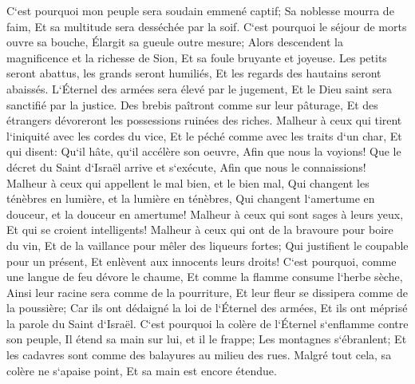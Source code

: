 \verse C`est pourquoi mon peuple sera soudain emmené captif; Sa noblesse mourra de faim, Et sa multitude sera desséchée par la soif. 
\verse C`est pourquoi le séjour de morts ouvre sa bouche, Élargit sa gueule outre mesure; Alors descendent la magnificence et la richesse de Sion, Et sa foule bruyante et joyeuse. 
\verse Les petits seront abattus, les grands seront humiliés, Et les regards des hautains seront abaissés. 
\verse L`Éternel des armées sera élevé par le jugement, Et le Dieu saint sera sanctifié par la justice. 
\verse Des brebis paîtront comme sur leur pâturage, Et des étrangers dévoreront les possessions ruinées des riches. 
\verse Malheur à ceux qui tirent l`iniquité avec les cordes du vice, Et le péché comme avec les traits d`un char, 
\verse Et qui disent: Qu`il hâte, qu`il accélère son oeuvre, Afin que nous la voyions! Que le décret du Saint d`Israël arrive et s`exécute, Afin que nous le connaissions! 
\verse Malheur à ceux qui appellent le mal bien, et le bien mal, Qui changent les ténèbres en lumière, et la lumière en ténèbres, Qui changent l`amertume en douceur, et la douceur en amertume! 
\verse Malheur à ceux qui sont sages à leurs yeux, Et qui se croient intelligents! 
\verse Malheur à ceux qui ont de la bravoure pour boire du vin, Et de la vaillance pour mêler des liqueurs fortes; 
\verse Qui justifient le coupable pour un présent, Et enlèvent aux innocents leurs droits! 
\verse C`est pourquoi, comme une langue de feu dévore le chaume, Et comme la flamme consume l`herbe sèche, Ainsi leur racine sera comme de la pourriture, Et leur fleur se dissipera comme de la poussière; Car ils ont dédaigné la loi de l`Éternel des armées, Et ils ont méprisé la parole du Saint d`Israël. 
\verse C`est pourquoi la colère de l`Éternel s`enflamme contre son peuple, Il étend sa main sur lui, et il le frappe; Les montagnes s`ébranlent; Et les cadavres sont comme des balayures au milieu des rues. Malgré tout cela, sa colère ne s`apaise point, Et sa main est encore étendue. 
